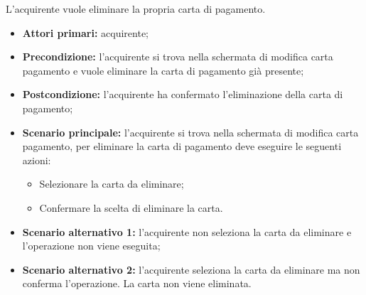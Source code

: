 L'acquirente vuole eliminare la propria carta di pagamento.
\begin{itemize}
    \item \textbf{Attori primari:} acquirente;
    \item \textbf{Precondizione:} l'acquirente si trova nella schermata di modifica carta pagamento e vuole eliminare la carta di pagamento già presente;
    \item \textbf{Postcondizione:} l'acquirente ha confermato l'eliminazione della carta di pagamento;
    \item \textbf{Scenario principale:} l'acquirente si trova nella schermata di modifica carta pagamento, per eliminare la carta di pagamento deve eseguire le seguenti azioni:
        \begin{itemize}
            \item Selezionare la carta da eliminare;
            \item Confermare la scelta di eliminare la carta.
        \end{itemize}
    \item \textbf{Scenario alternativo 1:} l'acquirente non seleziona la carta da eliminare e l'operazione non viene eseguita;
    \item \textbf{Scenario alternativo 2:} l'acquirente seleziona la carta da eliminare ma non conferma l'operazione. La carta non viene eliminata.
\end{itemize}

